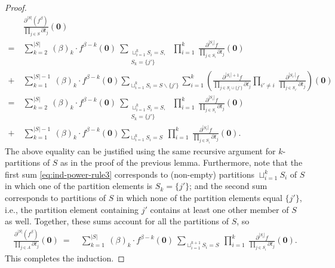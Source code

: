 \documentclass[10pt,a4paper]{amsart}
\begin{document}
\begin{proof}
\begin{align}
\nonumber
& \frac{\partial^{|S|} (f^\beta)}{\prod_{j \in S}\partial t_j}(\mathbf{0}) \\
\nonumber
= \ & 
\sum_{k=2}^{|S|} \ (\beta)_k \cdot f^{\beta-k}(\mathbf{0}) \ \sum_{\substack{\sqcup_{i=1}^{k} S_i = S, \\ S_{k}=\{j'\}}} \ \prod_{i=1}^{k} \ \frac{\partial^{|S_i|}f}{\prod_{j\in S_i}\partial t_j}(\mathbf{0}) \\
\nonumber
+ \ & \sum_{k=1}^{|S|-1} \ (\beta)_k \cdot f^{\beta-k}(\mathbf{0})\sum_{\sqcup_{i=1}^k S_i = S\backslash\{j'\}} \sum_{i=1}^k \left(\frac{\partial^{|S_i|+1}f}{\prod\limits_{j\in S_i\cup\{j'\}}\partial t_j}\prod_{i'\neq i} \ \frac{\partial^{|S_{i'}|}f}{\prod_{j\in S_{i'}}\partial t_j}\right)(\mathbf{0}) \\
\label{eq:ind-power-rule3}
= \ & 
\sum_{k=2}^{|S|} \ (\beta)_k \cdot f^{\beta-k}(\mathbf{0}) \ \sum_{\substack{\sqcup_{i=1}^{k} S_i = S, \\ S_{k}=\{j'\}}} \ \prod_{i=1}^{k} \ \frac{\partial^{|S_i|}f}{\prod_{j\in S_i}\partial t_j}(\mathbf{0}) \\
\label{eq:ind-power-rule4}
+ \ & \sum_{k=1}^{|S|-1} \ (\beta)_k \cdot f^{\beta-k}(\mathbf{0})\sum_{\sqcup_{i=1}^k S_i = S} \ \prod_{i=1}^k \ \frac{\partial^{|S_{i}|}f}{\prod_{j\in S_{i}}\partial t_j}(\mathbf{0}).
\end{align}
The above equality can be justified using the same recursive argument for $k$-partitions of $S$ as in the proof of the previous lemma. Furthermore, note that the first sum \eqref{eq:ind-power-rule3} corresponds to (non-empty) partitions $\sqcup_{i=1}^k S_i$ of $S$ in which one of the partition elements is $S_k=\{j'\}$; and the second sum corresponds to partitions of $S$ in which none of the partition elements equal $\{j'\}$, i.e., the partition element containing $j'$ contains at least one other member of $S$ as well. Together, these sums account for all the partitions of $S$, so
\begin{align}
\frac{\partial^{|S|} (f^\beta)}{\prod_{j \in A}\partial t_j}(\mathbf{0}) \ = \ & \sum_{k=1}^{|S|} \ (\beta)_{k} \cdot f^{\beta-k}(\mathbf{0}) \ \sum_{\sqcup_{i=1}^{k+1} S_i = S} \ \prod_{i=1}^{k} \ \frac{\partial^{|S_i|}f}{\prod_{j\in S_i}\partial t_j}(\mathbf{0}).
\end{align}  
This completes the induction. 
\end{proof}
\end{document}
